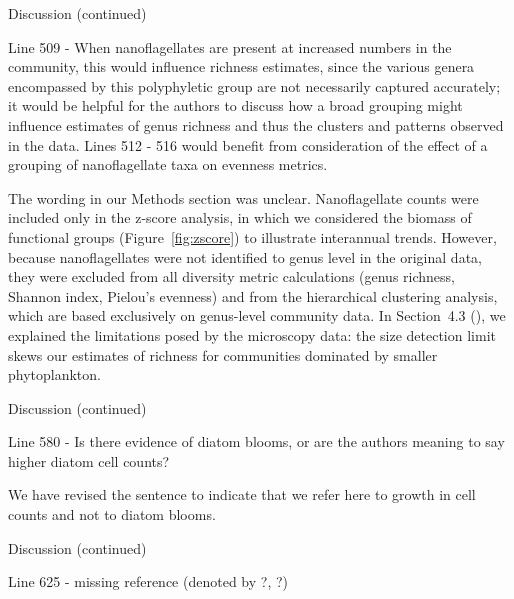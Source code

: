 \documentclass[12pt,english]{reviewresponse}
\begin{document}
\begin{revcomment}
	Discussion (continued)

    Line 509 - When nanoflagellates are present at increased numbers in the community, this would influence richness estimates, since the various genera encompassed by this polyphyletic group are not necessarily captured accurately; it would be helpful for the authors to discuss how a broad grouping might influence estimates of genus richness and thus the clusters and patterns observed in the data. Lines 512 - 516 would benefit from consideration of the effect of a grouping of nanoflagellate taxa on evenness metrics.
\end{revcomment}
\begin{revresponse}
    The wording in our Methods section was unclear. Nanoflagellate counts were included only in the z-score analysis, in which we considered the biomass of functional groups (Figure~\ref{fig:zscore}) to illustrate interannual trends. However, because nanoflagellates were not identified to genus level in the original data, they were excluded from all diversity metric calculations (genus richness, Shannon index, Pielou's evenness) and from the hierarchical clustering analysis, which are based exclusively on genus-level community data. In Section~4.3 (), we explained the limitations posed by the microscopy data: the size detection limit skews our estimates of richness for communities dominated by smaller phytoplankton.
\end{revresponse}


\begin{revcomment}
	Discussion (continued)

    Line 580 - Is there evidence of diatom blooms, or are the authors meaning to say higher diatom cell counts?
\end{revcomment}
\begin{revresponse}
	We have revised the sentence to indicate that we refer here to growth in cell counts and not to diatom blooms. 
\end{revresponse}


\begin{revcomment}
	Discussion (continued)

    Line 625 - missing reference (denoted by ?, ?)
\end{revcomment}
\begin{revresponse}
\end{revresponse}
\end{document}
